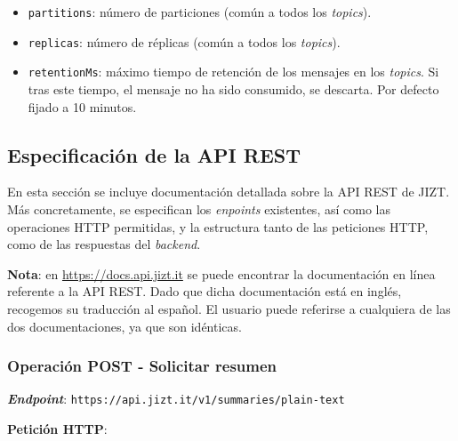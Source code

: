 \begin{itemize} [\textbullet]
	\begin{itemize} [◦]
		\item \texttt{partitions}: número de particiones (común a todos los \emph{topics}).
		\item \texttt{replicas}: número de réplicas (común a todos los \emph{topics}).
		\item \texttt{retentionMs}: máximo tiempo de retención de los mensajes en los \emph{topics}. Si tras este tiempo, el mensaje no ha sido consumido, se descarta. Por defecto fijado a 10 minutos.
	\end{itemize}
\end{itemize}

\subsection{Especificación de la API REST} \label{subsection:api-docs}

En esta sección se incluye documentación detallada sobre la API REST de JIZT. Más concretamente, se especifican los \emph{enpoints} existentes, así como las operaciones HTTP permitidas, y la estructura tanto de las peticiones HTTP, como de las respuestas del \emph{backend}.

\textbf{Nota}: en \href{https://docs.api.jizt.it}{https://docs.api.jizt.it} se puede encontrar la documentación en línea referente a la API REST. Dado que dicha documentación está en inglés, recogemos su traducción al español. El usuario puede referirse a cualquiera de las dos documentaciones, ya que son idénticas.


\subsubsection{Operación POST - Solicitar resumen}

\textbf{\emph{Endpoint}}: \texttt{https://api.jizt.it/v1/summaries/plain-text}

\textbf{Petición HTTP}:


